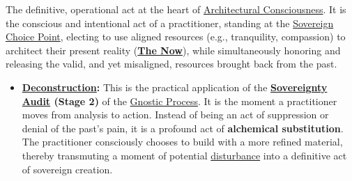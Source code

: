 \item[\hypertarget{gloss:sovereign_choice}{The Sovereign Choice}] 
    The definitive, operational act at the heart of \hyperlink{gloss:architectural_consciousness}{Architectural Consciousness}. It is the conscious and intentional act of a practitioner, standing at the \hyperlink{gloss:sovereign_choice_point}{Sovereign Choice Point}, electing to use aligned resources (e.g., tranquility, compassion) to architect their present reality (\textbf{\hyperlink{gloss:the_now}{The Now}}), while simultaneously honoring and releasing the valid, and yet misaligned, resources brought back from the past.
    \begin{itemize}
        \item \textbf{\hyperlink{gloss:deconstruction}{Deconstruction}:} This is the practical application of the \textbf{\hyperlink{gloss:sovereignty_audit}{\hyperlink{gloss:sovereignty}{\hyperlink{gloss:sovereignty}{Sovereignty}} Audit} (Stage 2)} of the \hyperlink{gloss:gnostic_process}{Gnostic Process}. It is the moment a practitioner moves from analysis to action. Instead of being an act of suppression or denial of the past's pain, it is a profound act of \textbf{alchemical substitution}. The practitioner consciously chooses to build with a more refined material, thereby transmuting a moment of potential \hyperlink{gloss:disturbance}{disturbance} into a definitive act of sovereign creation.
    \end{itemize}

